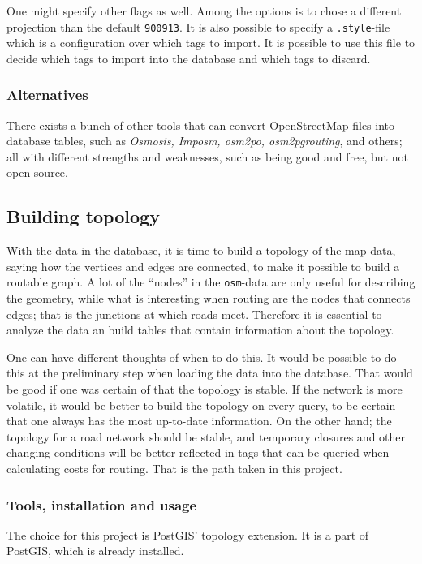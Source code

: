 \documentclass[../main.tex]{subfiles}
\begin{document}
One might specify other flags as well. Among the options is to chose a different projection than the default \texttt{900913}. It is also possible to specify a \texttt{.style}-file which is a configuration over which tags to import. It is possible to use this file to decide which tags to import into the database and which tags to discard.

\subsubsection{Alternatives}
There exists a bunch of other tools that can convert OpenStreetMap files into database tables, such as \emph{Osmosis, Imposm, osm2po, osm2pgrouting}, and others; all with different strengths and weaknesses, such as being good and free, but not open source.

\subsection{Building topology}
With the data in the database, it is time to build a topology of the map data, saying how the vertices and edges are connected, to make it possible to build a routable graph. A lot of the ``nodes'' in the \texttt{osm}-data are only useful for describing the geometry, while what is interesting when routing are the nodes that connects edges; that is the junctions at which roads meet. Therefore it is essential to analyze the data an build tables that contain information about the topology.

One can have different thoughts of when to do this. It would be possible to do this at the preliminary step when loading the data into the database. That would be good if one was certain of that the topology is stable. If the network is more volatile, it would be better to build the topology on every query, to be certain that one always has the most up-to-date information. On the other hand; the topology for a road network should be stable, and temporary closures  and other changing conditions will be better reflected in tags that can be queried when calculating costs for routing. That is the path taken in this project.

\subsubsection{Tools, installation and usage}
The choice for this project is PostGIS' topology extension. It is a part of PostGIS, which is already installed.
\end{document}
